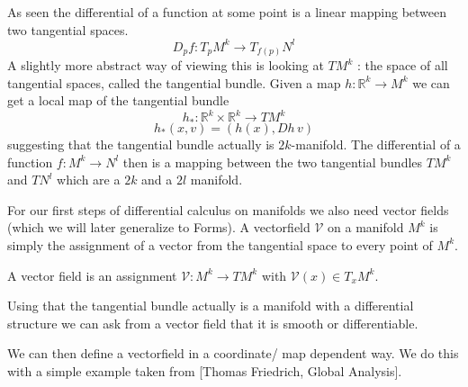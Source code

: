 As seen the differential of a function at some point is a linear mapping between two tangential spaces.
\[D_pf: T_p M^k \rightarrow T_{f(p)} N^l\]
A slightly more abstract way of viewing this is looking at $T M^k$ : the space of all tangential spaces, called the tangential bundle. Given a map $h:\mathbb R^k \rightarrow M^k$ we can get a local map of the tangential bundle 
\[h_* : \mathbb R^k \times \mathbb R^k \rightarrow T M^k\]
\[h_*(x,v) = (h(x), Dh\, v)\]
suggesting that the tangential bundle actually is $2k$-manifold. The differential of a function $f: M^k \rightarrow N^l$ then is a mapping between the two tangential bundles $T M^k$ and $T N^l$ which are a $2k$ and a $2l$ manifold.

For our first steps of differential calculus on manifolds we also need vector fields (which we will later generalize to Forms).  A vectorfield $\mathcal V$ on a manifold $M^k$ is simply the assignment of a vector from the tangential space to every point of $M^k$.
\begin{definition}
A vector field is an assignment $\mathcal V: M^k \rightarrow T M^k$ with $\mathcal V(x) \in T_x M^k$.
\end{definition}
Using that the tangential bundle actually is a manifold with a differential structure we can ask from a vector field that it is smooth or differentiable.

We can then define a vectorfield in a coordinate/ map dependent way. We do this with a simple example taken from [Thomas Friedrich, Global Analysis].


